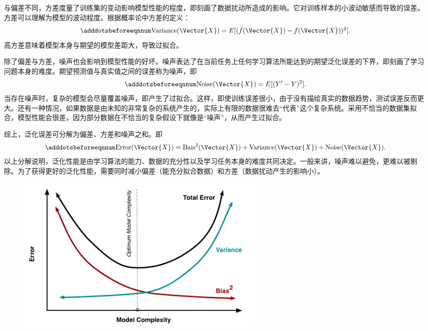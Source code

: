 与偏差不同，方差度量了训练集的变动影响模型性能的程度，即刻画了数据扰动所造成的影响。它对训练样本的小波动敏感而导致的误差。方差可以理解为模型的波动程度。根据概率论中方差的定义：
\begin{equation}\adddotsbeforeeqnnum
  \label{eq:ml_variance}
  \text{Variance}(\Vector{X})=E[(\hat{f}(\Vector{X})-f(\Vector{X}))^2].
\end{equation}
高方差意味着模型本身与期望的模型差距大，导致过拟合。

除了偏差与方差，噪声也会影响到模型性能的好坏。噪声表达了在当前任务上任何学习算法所能达到的期望泛化误差的下界，即刻画了学习问题本身的难度。期望预测值与真实值之间的误差称为噪声，即
\begin{equation}\adddotsbeforeeqnnum
  \label{eq:ml_noise}
  \text{Noise}(\Vector{X})=E[(Y^{\prime}-Y)^2].
\end{equation}
当存在噪声时，复杂的模型会尽量覆盖噪声，即产生了过拟合。这样，即使训练误差很小，由于没有描绘真实的数据趋势，测试误差反而更大。还有一种情况，如果数据是由未知的非常复杂的系统产生的，实际上有限的数据很难去“代表”这个复杂系统。采用不恰当的数据集拟合，模型性能会很差，因为部分数据在不恰当的复杂假设下就像是“噪声”，从而产生过拟合。

综上，泛化误差可分解为偏差、方差和噪声之和。即
\begin{equation}\adddotsbeforeeqnnum
  \label{eq:ml_error}
  \text{Error}(\Vector{X})=\text{Bais}^2(\Vector{X})+\text{Variance}(\Vector{X})+\text{Noise}(\Vector{X}).
\end{equation}
以上分解说明，泛化性能是由学习算法的能力、数据的充分性以及学习任务本身的难度共同决定。一般来讲，噪声难以避免，更难以被剔除。为了获得更好的泛化性能，需要同时减小偏差（能充分拟合数据）和方差（数据扰动产生的影响小）。

\begin{figure}[!htbp]
  \centering
  \includegraphics[width=0.6\textwidth]{Img/chap2_ml/bias.png}
  \label{fig:ml_bias}
\end{figure}

